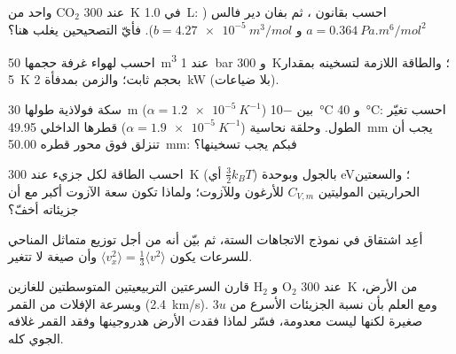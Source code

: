 \begin{exercise}[$\star\star$]\label{exo:b1:kinetic-theory:7}
 واحد من CO$_2$ عند \qty{300}{K} في \qty{1.0}{L}: احسب  بقانون
، ثم بفان دير فالس ($a = \qty{0.364}{Pa.m^6/mol^2}$ و
$b = \qty{4.27e-5}{m^3/mol}$). فأيّ التصحيحين يغلب هنا؟
\end{exercise}

\begin{exercise}[$\star\star$]\label{exo:b1:kinetic-theory:8}
احسب  لهواء غرفة حجمها \qty{50}{m^3} عند \qty{1}{bar} و
\qty{300}{K}؛ والطاقة اللازمة لتسخينه بمقدار \qty{5}{K} بحجم ثابت؛ والزمن
بمدفأة \qty{2}{kW} (بلا ضياعات).
\end{exercise}

\begin{exercise}[$\star\star$]\label{exo:b1:kinetic-theory:9}
سكة فولاذية طولها \qty{30}{m} ($\alpha = \qty{1.2e-5}{K^{-1}}$) بين
\qty{-10}{\degreeCelsius} و \qty{40}{\degreeCelsius}: احسب تغيّر الطول.
وحلقة نحاسية ($\alpha = \qty{1.9e-5}{K^{-1}}$) قطرها الداخلي
\qty{49.95}{mm} يجب أن تنزلق فوق محور قطره \qty{50.00}{mm}: فبكم يجب
تسخينها؟
\end{exercise}

\begin{exercise}[$\star\star\star$]\label{exo:b1:kinetic-theory:10}
احسب الطاقة لكل جزيء عند \qty{300}{K} (أي $\tfrac32 k_BT$) بالجول وبوحدة \unit{eV}؛
والسعتين الحراريتين الموليتين $C_{V,m}$ للأرغون وللآزوت؛ ولماذا تكون سعة
الآزوت أكبر مع أن جزيئاته أخفّ؟
\end{exercise}

\begin{exercise}[$\star\star\star$]\label{exo:b1:kinetic-theory:11}
أعِد اشتقاق  في نموذج الاتجاهات الستة،
ثم بيّن أنه من أجل توزيع متماثل المناحي للسرعات يكون $\langle v_x^2\rangle
= \tfrac13\langle v^2\rangle$ وأن صيغة  لا تتغير.
\end{exercise}

\begin{exercise}[$\star\star\star$]\label{exo:b1:kinetic-theory:12}
قارن السرعتين التربيعيتين المتوسطتين للغازين H$_2$ و O$_2$ عند \qty{300}{K}
 من الأرض، وبسرعة الإفلات من القمر (\qty{2.4}{km/s}).
ومع العلم بأن نسبة الجزيئات الأسرع من $3u$ صغيرة لكنها ليست
معدومة، فسّر لماذا فقدت الأرض هدروجينها وفقد القمر غلافه
الجوي كله.
\end{exercise}

